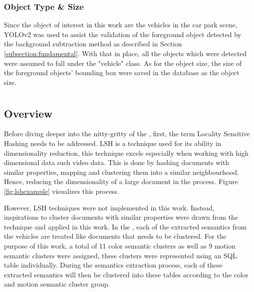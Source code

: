 

\subsubsection{Object Type \& Size}
\label{objecttype}
Since the object of interest in this work are the vehicles in the car park scene, YOLOv2 was used to assist the validation of the foreground object detected by the background subtraction method as described in Section \ref{subsection:fundamental}. With that in place, all the objects which were detected were assumed to fall under the "vehicle" class. As for the object size, the size of the foreground objects' bounding box were saved in the database as the object size.





\section{\versionOneExt }
\label{section:semantic_lsh}

\subsection{Overview}
Before diving deeper into the nitty-gritty of the \versionOneExt, first, the term Locality Sensitive Hashing needs to be addressed. LSH is a technique used for its ability in dimensionality reduction, this technique excels especially when working with high dimensional data such video data.
This is done by hashing documents with similar properties, mapping and clustering them into a similar neighbourhood. Hence, reducing the dimensionality of a large document in the process. Figure \ref{fig:lshexample} visualizes this process.

However, LSH techniques were not implemented in this work. Instead, inspirations to cluster documents with similar properties were drawn from the technique and applied in this work. 
In the \versionOneExt, each of the extracted semantics from the vehicles are treated like documents that needs to be  clustered. For the purpose of this work, a total of 11 color semantic clusters as well as 9 motion semantic clusters were assigned, these clusters were represented using an SQL table individually. 
During the semantics extraction process, each of these extracted semantics will then be clustered into these tables according to the color and motion semantic cluster group.



